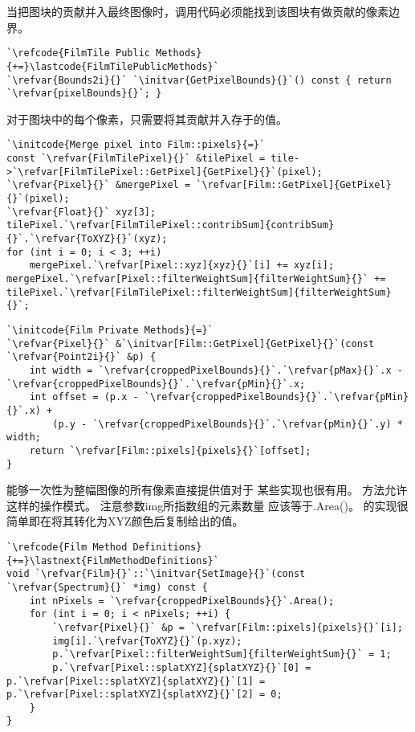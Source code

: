 当把图块的贡献并入最终图像时，调用代码必须能找到该图块有做贡献的像素边界。
\begin{lstlisting}
`\refcode{FilmTile Public Methods}{+=}\lastcode{FilmTilePublicMethods}`
`\refvar{Bounds2i}{}` `\initvar{GetPixelBounds}{}`() const { return `\refvar{pixelBounds}{}`; }
\end{lstlisting}

对于图块中的每个像素，只需要将其贡献并入存于的值。
\begin{lstlisting}
`\initcode{Merge pixel into Film::pixels}{=}`
const `\refvar{FilmTilePixel}{}` &tilePixel = tile->`\refvar[FilmTilePixel::GetPixel]{GetPixel}{}`(pixel);
`\refvar{Pixel}{}` &mergePixel = `\refvar[Film::GetPixel]{GetPixel}{}`(pixel);
`\refvar{Float}{}` xyz[3];
tilePixel.`\refvar[FilmTilePixel::contribSum]{contribSum}{}`.`\refvar{ToXYZ}{}`(xyz);
for (int i = 0; i < 3; ++i)
    mergePixel.`\refvar[Pixel::xyz]{xyz}{}`[i] += xyz[i];
mergePixel.`\refvar[Pixel::filterWeightSum]{filterWeightSum}{}` += tilePixel.`\refvar[FilmTilePixel::filterWeightSum]{filterWeightSum}{}`;
\end{lstlisting}
\begin{lstlisting}
`\initcode{Film Private Methods}{=}`
`\refvar{Pixel}{}` &`\initvar[Film::GetPixel]{GetPixel}{}`(const `\refvar{Point2i}{}` &p) {
    int width = `\refvar{croppedPixelBounds}{}`.`\refvar{pMax}{}`.x - `\refvar{croppedPixelBounds}{}`.`\refvar{pMin}{}`.x;
    int offset = (p.x - `\refvar{croppedPixelBounds}{}`.`\refvar{pMin}{}`.x) +
        (p.y - `\refvar{croppedPixelBounds}{}`.`\refvar{pMin}{}`.y) * width;
    return `\refvar[Film::pixels]{pixels}{}`[offset];
}
\end{lstlisting}

能够一次性为整幅图像的所有像素直接提供值对于
某些实现也很有用。
方法允许这样的操作模式。
注意参数{\ttfamily img}所指数组的元素数量
应该等于{\ttfamily{}.Area()}。
的实现很简单即在将其转化为XYZ颜色后复制给出的值。
\begin{lstlisting}
`\refcode{Film Method Definitions}{+=}\lastnext{FilmMethodDefinitions}`
void `\refvar{Film}{}`::`\initvar{SetImage}{}`(const `\refvar{Spectrum}{}` *img) const {
    int nPixels = `\refvar{croppedPixelBounds}{}`.Area();
    for (int i = 0; i < nPixels; ++i) {
        `\refvar{Pixel}{}` &p = `\refvar[Film::pixels]{pixels}{}`[i];
        img[i].`\refvar{ToXYZ}{}`(p.xyz);
        p.`\refvar[Pixel::filterWeightSum]{filterWeightSum}{}` = 1;
        p.`\refvar[Pixel::splatXYZ]{splatXYZ}{}`[0] = p.`\refvar[Pixel::splatXYZ]{splatXYZ}{}`[1] = p.`\refvar[Pixel::splatXYZ]{splatXYZ}{}`[2] = 0;
    }
}
\end{lstlisting}

